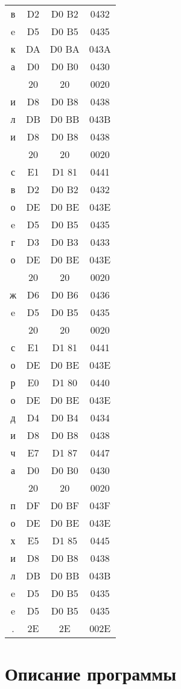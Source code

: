 \begin{center}
\begin{tabular}{|c|c|c|c|}
в & D2 & D0 B2 & 0432\\
e & D5 & D0 B5 & 0435\\
к & DA & D0 BA & 043A\\
а & D0 & D0 B0 & 0430\\
  & 20 & 20 & 0020\\
и & D8 & D0 B8 & 0438\\
л & DB & D0 BB & 043B\\
и & D8 & D0 B8 & 0438\\
  & 20 & 20 & 0020\\
с & E1 & D1 81 & 0441\\
в & D2 & D0 B2 & 0432\\
о & DE & D0 BE & 043E\\
e & D5 & D0 B5 & 0435\\
г & D3 & D0 B3 & 0433\\
о & DE & D0 BE & 043E\\
  & 20 & 20 & 0020\\
ж & D6 & D0 B6 & 0436\\
e & D5 & D0 B5 & 0435\\
  & 20 & 20 & 0020\\
с & E1 & D1 81 & 0441\\
о & DE & D0 BE & 043E\\
р & E0 & D1 80 & 0440\\
о & DE & D0 BE & 043E\\
д & D4 & D0 B4 & 0434\\
и & D8 & D0 B8 & 0438\\
ч & E7 & D1 87 & 0447\\
а & D0 & D0 B0 & 0430\\
  & 20 & 20 & 0020\\
п & DF & D0 BF & 043F\\
о & DE & D0 BE & 043E\\
х & E5 & D1 85 & 0445\\
и & D8 & D0 B8 & 0438\\
л & DB & D0 BB & 043B\\
e & D5 & D0 B5 & 0435\\
e & D5 & D0 B5 & 0435\\
. & 2E &    2E & 002E\\
\hline
\end{tabular}
\end{center}

\section{Описание программы}
